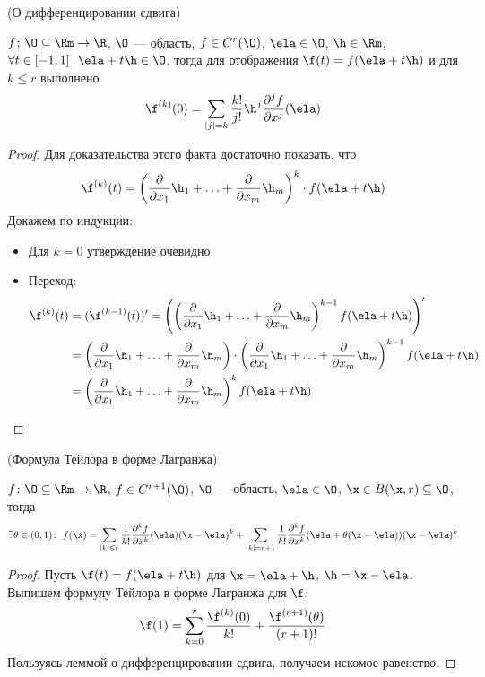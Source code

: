 \begin{lemma}(О дифференцировании сдвига)

    $f \colon \O \subseteq \Rm \to \R$, $\O$ --- область, $f \in C^r(\O)$, $\ela
    \in \O$, $\h \in \Rm$, $\forall t \in [-1, 1]~~ \ela + t\h \in \O$, тогда
    для отображения $\f(t) = f(\ela + t\h)$ и для $k \leqslant r$ выполнено
\[
    \f^{(k)}(0) = \sum_{|j| = k}{\frac{k!}{j!}\h^j \frac{\partial^j f}{\partial
    x^j}(\ela)}
\]
\end{lemma}
\begin{proof}
    Для доказательства этого факта достаточно показать, что
\[
    \f^{(k)}(t) = \left(\frac{\partial}{\partial x_1}\h_1 + \ldots +
    \frac{\partial}{\partial x_m}\h_m\right)^k \cdot f(\ela + t\h)
\]
    Докажем по индукции:
    \begin{itemize}
        \item Для $k = 0$ утверждение очевидно.
        \item Переход:
\begin{align*}
        \f^{(k)}(t) &= (\f^{(k - 1)}(t))' =
        \left(\left(\frac{\partial}{\partial x_1}\h_1 + \ldots +
        \frac{\partial}{\partial x_m}\h_m\right)^{k - 1} f(\ela +
        t\h)\right)' \\
        &= \left(\frac{\partial}{\partial x_1}\h_1 + \ldots +
        \frac{\partial}{\partial x_m}\h_m\right) \cdot
        \left(\frac{\partial}{\partial x_1}\h_1 + \ldots +
        \frac{\partial}{\partial x_m}\h_m\right)^{k - 1} f(\ela +
        t\h) \\
        &= \left(\frac{\partial}{\partial x_1}\h_1 + \ldots +
        \frac{\partial}{\partial x_m}\h_m\right)^{k} f(\ela +
        t\h)
\end{align*}
    \end{itemize}
\end{proof}

\begin{theorem}(Формула Тейлора в форме Лагранжа)

    $f \colon \O \subseteq \Rm \to \R$, $f \in C^{r+1}(\O)$, $\O$ --- область,
    $\ela \in \O$, $\x \in B(\x, r) \subseteq \O$, тогда
\[
    \exists \theta \in (0, 1)\colon~
    f(\x) = \sum_{|k| \leqslant r}{\frac{1}{k!}
    \frac{\partial^k f}{\partial x^k}(\ela) (\x - \ela)^k}
    + \sum_{|k| = r+1}{\frac{1}{k!} \frac{\partial^k f}{\partial x^k}(\ela +
    \theta(\x - \ela))(\x - \ela)^k}
\]
\end{theorem}
\begin{proof}
    Пусть $\f(t) = f(\ela + t\h)$ для $\x = \ela + \h$, $\h = \x - \ela$.
    Выпишем формулу Тейлора в форме Лагранжа для $\f$:
\[
    \f(1) = \sum_{k = 0}^{r}{\frac{\f^{(k)}(0)}{k!}} +
    \frac{\f^{(r+1)}(\theta)}{(r+1)!}
\]
    Пользуясь леммой о дифференцировании сдвига, получаем искомое равенство.
\end{proof}

